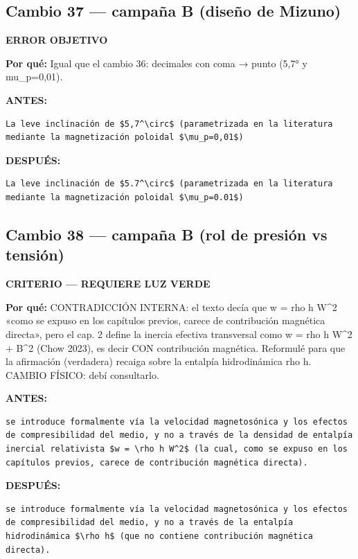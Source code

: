 \documentclass[11pt,a4paper]{article}
\begin{document}
\subsection*{Cambio 37 --- campaña B (diseño de Mizuno)}
\colorbox{okbg}{\textbf{\footnotesize ERROR OBJETIVO}}

\textbf{Por qué:} Igual que el cambio 36: decimales con coma → punto (5,7° y mu\_p=0,01).

\textcolor{antesline}{\textbf{ANTES:}}
\begin{Verbatim}[breaklines=true, breakanywhere=true, fontsize=\small, frame=leftline, rulecolor=\color{antesline}, framerule=1.2pt]
La leve inclinación de $5,7^\circ$ (parametrizada en la literatura mediante la magnetización poloidal $\mu_p=0,01$)
\end{Verbatim}
\textcolor{despline}{\textbf{DESPUÉS:}}
\begin{Verbatim}[breaklines=true, breakanywhere=true, fontsize=\small, frame=leftline, rulecolor=\color{despline}, framerule=1.2pt]
La leve inclinación de $5.7^\circ$ (parametrizada en la literatura mediante la magnetización poloidal $\mu_p=0.01$)
\end{Verbatim}

\subsection*{Cambio 38 --- campaña B (rol de presión vs tensión)}
\colorbox{critbg}{\textbf{\footnotesize CRITERIO --- REQUIERE LUZ VERDE}}

\textbf{Por qué:} CONTRADICCIÓN INTERNA: el texto decía que w = rho h W\textasciicircum{}2 «como se expuso en los capítulos previos, carece de contribución magnética directa», pero el cap. 2 define la inercia efectiva transversal como w = rho h W\textasciicircum{}2 + B\textasciicircum{}2 (Chow 2023), es decir CON contribución magnética. Reformulé para que la afirmación (verdadera) recaiga sobre la entalpía hidrodinámica rho h. CAMBIO FÍSICO: debí consultarlo.

\textcolor{antesline}{\textbf{ANTES:}}
\begin{Verbatim}[breaklines=true, breakanywhere=true, fontsize=\small, frame=leftline, rulecolor=\color{antesline}, framerule=1.2pt]
se introduce formalmente vía la velocidad magnetosónica y los efectos de compresibilidad del medio, y no a través de la densidad de entalpía inercial relativista $w = \rho h W^2$ (la cual, como se expuso en los capítulos previos, carece de contribución magnética directa).
\end{Verbatim}
\textcolor{despline}{\textbf{DESPUÉS:}}
\begin{Verbatim}[breaklines=true, breakanywhere=true, fontsize=\small, frame=leftline, rulecolor=\color{despline}, framerule=1.2pt]
se introduce formalmente vía la velocidad magnetosónica y los efectos de compresibilidad del medio, y no a través de la entalpía hidrodinámica $\rho h$ (que no contiene contribución magnética directa).
\end{Verbatim}
\end{document}
